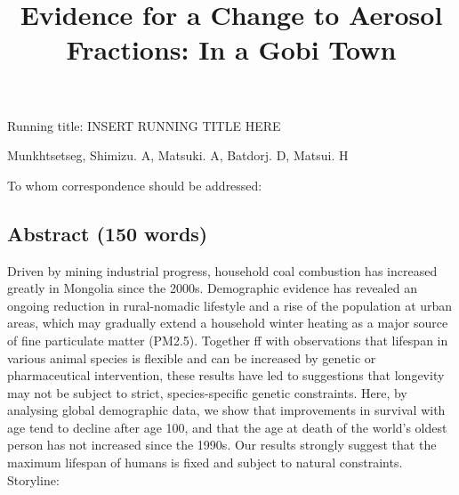 \documentclass[
  11pt,
]{article}
\title{\textbf{Evidence for a Change to Aerosol Fractions: In a Gobi
Town}}
\author{}
\date{\vspace{-2.5em}}
\begin{document}
\maketitle

\vspace{35mm}

Running title: INSERT RUNNING TITLE HERE

\vspace{35mm}

Munkhtsetseg, Shimizu. A, Matsuki. A, Batdorj. D, Matsui. H

\vspace{40mm}

To whom correspondence should be addressed:

\newpage
\linenumbers

\subsection{Abstract (150 words)}\label{abstract-150-words}

Driven by mining industrial progress, household coal combustion has
increased greatly in Mongolia since the 2000s. Demographic evidence has
revealed an ongoing reduction in rural-nomadic lifestyle and a rise of
the population at urban areas, which may gradually extend a household
winter heating as a major source of fine particulate matter (PM2.5).
Together ff with observations that lifespan in various animal species is
flexible and can be increased by genetic or pharmaceutical intervention,
these results have led to suggestions that longevity may not be subject
to strict, species-specific genetic constraints. Here, by analysing
global demographic data, we show that improvements in survival with age
tend to decline after age 100, and that the age at death of the world's
oldest person has not increased since the 1990s. Our results strongly
suggest that the maximum lifespan of humans is fixed and subject to
natural constraints. Storyline:
\end{document}
